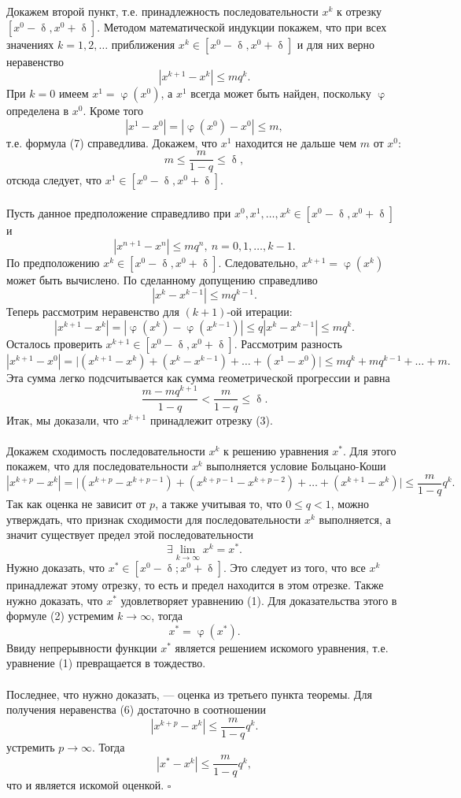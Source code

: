 \documentclass[a4paper, 12pt]{report}
\numberwithin{equation}{section}
\newenvironment{Proof} %
{\par\noindent{$\blacklozenge$}} %
{\hfill$\scriptstyle\square$}
\renewcommand{\leq}{\leqslant}
\renewcommand{\delta}{\updelta}
\renewcommand{\varphi}{\upvarphi}
\begin{document}
	\begin{Proof}
		Докажем второй пункт, т.е. принадлежность последовательности $x^k$ к отрезку $[x^0 - \delta, x^0 + \delta]$.
		Методом математической индукции покажем, что при всех значениях $k=1,2,\ldots$ приближения $x^k \in [x^0 - \delta, x^0 + \delta]$ и для них верно неравенство 
		\begin{equation}
			|x^{k+1} - x^k| \leq mq^k.
		\end{equation}
		При $k=0$ имеем $x^1 = \varphi(x^0)$, а $x^1$ всегда может быть найден, поскольку $\varphi$ определена в $x^0$. Кроме того  $$|x^1 - x^0| = |\varphi(x^0) - x^0| \leq m,$$ т.е. формула (7) справедлива. Докажем, что $x^1$ находится не дальше чем $m$ от $x^0$: $$m \leq \dfrac{m}{1-q}\leq \delta,$$ отсюда следует, что $x^1 \in [x^0 - \delta, x^0 + \delta]$.
		\\\\
		Пусть данное предположение справедливо при $x^0,x^1,\ldots, x^k \in [x^0 - \delta, x^0 + \delta]$ и $$|x^{n+1} - x^n| \leq mq^n,\ n = 0,1,\ldots, k-1.$$
		По предположению $x^k \in [x^0 - \delta, x^0 + \delta]$. Следовательно, $x^{k+1} = \varphi(x^k)$ может быть вычислено. По сделанному допущению справедливо $$|x^k - x^{k-1}| \leq m q ^{k-1}.$$
		Теперь рассмотрим неравенство для $(k+1)$-ой итерации: $$|x^{k+1} - x^k| = |\varphi(x^k) - \varphi(x^{k-1})|\leq q|x^k - x^{k-1}| \leq mq^k.$$
		Осталось проверить $x^{k+1} \in  [x^0 - \delta, x^0 + \delta]$. Рассмотрим разность $$|x^{k+1} - x^0| = \Big|(x^{k+1} - x^k) + (x^k - x^{k-1}) + \ldots + (x^1 - x^0)\Big|\leq mq^k + mq^{k-1} +\ldots + m.$$
		Эта сумма легко подсчитывается как сумма геометрической прогрессии и равна $$\dfrac{m - mq^{k+1}}{1-q} < \dfrac{m}{1-q} \leq \delta.$$
		Итак, мы доказали, что $x^{k+1}$ принадлежит отрезку (3). \\\\
		Докажем сходимость последовательности $x^k$ к решению уравнения $x^*$. Для этого покажем, что для последовательности $x^k$ выполняется условие Больцано-Коши $$|x^{k+p} - x^k| = \Big|(x^{k+p} - x^{k+p-1}) + (x^{k+p-1} - x^{k+p-2}) + \ldots + (x^{k+1} - x^k)\Big|\leq \dfrac{m}{1-q}q^k.$$
		Так как оценка не зависит от $p$, а также учитывая то, что $0\leq q < 1$, можно утверждать, что признак сходимости для последовательности $x^k$ выполняется, а значит существует предел этой последовательности $$\exists \lim\limits_{k\to\infty}x^k = x^*.$$
		Нужно доказать, что $x^* \in [x^0 - \delta; x^0 + \delta]$. Это следует из того, что все $x^k$ принадлежат этому отрезку, то есть и предел находится в этом отрезке. Также нужно доказать, что $x^*$ удовлетворяет уравнению (1). Для доказательства этого в формуле (2) устремим $k\to\infty$, тогда $$x^* = \varphi(x^*).$$
		Ввиду непрерывности функции $x^*$ является решением искомого уравнения, т.е. уравнение (1) превращается в тождество.\\\\
		Последнее, что нужно доказать, --- оценка из третьего пункта теоремы. Для получения неравенства (6) достаточно в соотношении $$|x^{k+p} - x^k| \leq \dfrac{m}{1-q}q^k.$$ устремить $p \to \infty$. Тогда $$|x^* - x^k| \leq \dfrac{m}{1-q}q^k,$$ что и является искомой оценкой.
	\end{Proof}\\\\
\end{document}

